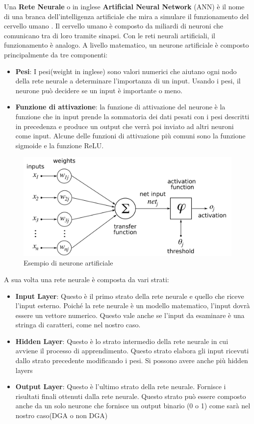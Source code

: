 \documentclass[12pt,a4paper,openright,twoside]{book}
\begin{document}
Una \textbf{Rete Neurale} o in inglese \textbf{Artificial Neural Network} (ANN) è il nome
di una branca dell'intelligenza artificiale che mira a simulare il
funzionamento del cervello umano \cite{zou2009overview}.
Il cervello umano è composto da miliardi di neuroni
che comunicano tra di loro tramite sinapsi.
Con le reti neurali artificiali, il funzionamento
è analogo. A livello matematico, un neurone artificiale è composto principalmente
da tre componenti:
\begin{itemize}
    \item \textbf{Pesi}: I pesi(weight in inglese) sono valori numerici che
    aiutano ogni nodo della rete neurale a determinare
    l'importanza di un input. Usando i pesi, il neurone
    può decidere se un input è importante o meno.
    \item \textbf{Funzione di attivazione}: la funzione di attivazione del neurone è la funzione
    che in input prende la sommatoria dei dati pesati con i pesi descritti in
    precedenza e produce un output che verrà poi inviato ad altri neuroni come
    input. Alcune delle funzioni di attivazione più comuni sono la funzione
    sigmoide e la funzione ReLU.
\end{itemize}

\begin{figure}
    \centering
    \includegraphics[width=.8\linewidth]{figures/ArtificialNeuronModel.png}
    \caption{Esempio di neurone artificiale \cite{wiki:xxx}}
    \label{fig:AN}
\end{figure}

A sua volta una rete neurale è composta da vari strati:
\begin{itemize}
    \item \textbf{Input Layer}: Questo è il primo strato della rete neurale
    e quello che riceve l'input esterno. Poiché la rete neurale
    è un modello matematico, l'input dovrà essere
    un vettore numerico. Questo vale anche se l'input da esaminare
    è una stringa di caratteri, come nel nostro caso.
    \item \textbf{Hidden Layer}: Questo è lo strato intermedio della rete neurale in cui avviene
    il processo di apprendimento.
    Questo strato elabora gli input ricevuti dallo strato precedente
    modificando i pesi. Si possono avere anche più hidden layers
    \item \textbf{Output Layer}: Questo è l'ultimo strato della rete neurale.
    Fornisce i risultati finali ottenuti dalla rete neurale. Questo strato
    può essere composto anche da un solo neurone che fornisce
    un output binario (0 o 1) come sarà nel nostro caso(DGA o non DGA)
\end{itemize}
\end{document}
